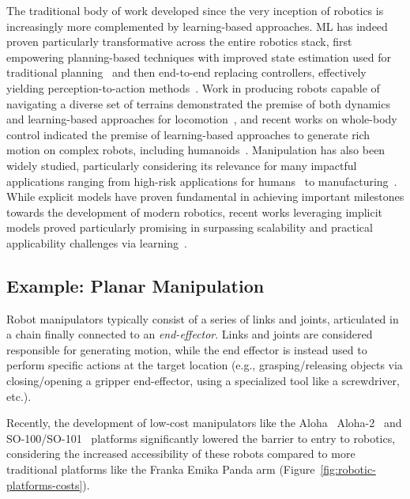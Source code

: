 The traditional body of work developed since the very inception of robotics is increasingly more complemented by learning-based approaches.
ML has indeed proven particularly transformative across the entire robotics stack, first empowering planning-based techniques with improved state estimation used for traditional planning~\citep{tangPerceptionNavigationAutonomous2023} and then end-to-end replacing controllers, effectively yielding perception-to-action methods~\citep{koberReinforcementLearningRobotics}.
Work in producing robots capable of navigating a diverse set of terrains demonstrated the premise of both dynamics and learning-based approaches for locomotion~\citep{griffinWalkingStabilizationUsing2017,jiDribbleBotDynamicLegged2023,leeLearningQuadrupedalLocomotion2020,margolisRapidLocomotionReinforcement2022}, and recent works on whole-body control indicated the premise of learning-based approaches to generate rich motion on complex robots, including humanoids~\citep{zhangWoCoCoLearningWholeBody2024,nvidiaGR00TN1Open2025}.
Manipulation has also been widely studied, particularly considering its relevance for many impactful applications ranging from high-risk applications for humans~\citep{fujitaDevelopmentRobotsNuclear2020,alizadehComprehensiveSurveySpace2024,fujitaDevelopmentRobotsNuclear2020} to manufacturing~\citep{sannemanStateIndustrialRobotics2020}.
While explicit models have proven fundamental in achieving important milestones towards the development of modern robotics, recent works leveraging implicit models proved particularly promising in surpassing scalability and practical applicability challenges via learning~\citep{koberReinforcementLearningRobotics}.

\subsection{Example: Planar Manipulation}
Robot manipulators typically consist of a series of links and joints, articulated in a chain finally connected to an \emph{end-effector}.
Links and joints are considered responsible for generating motion, while the end effector is instead used to perform specific actions at the target location (e.g., grasping/releasing objects via closing/opening a gripper end-effector, using a specialized tool like a screwdriver, etc.).

Recently, the development of low-cost manipulators like the Aloha~\citep{zhaoLearningFineGrainedBimanual2023} Aloha-2~\citep{aldacoALOHA2Enhanced} and SO-100/SO-101~\citep{knightStandardOpenSO100} platforms significantly lowered the barrier to entry to robotics, considering the increased accessibility of these robots compared to more traditional platforms like the Franka Emika Panda arm (Figure~\ref{fig:robotic-platforms-costs}).

